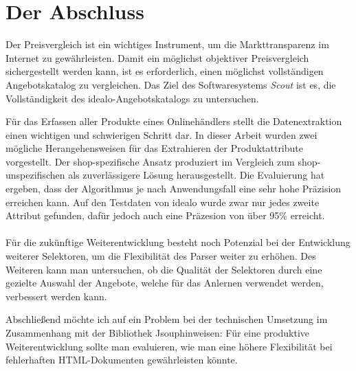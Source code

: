 \section{Der Abschluss}

Der Preisvergleich ist ein wichtiges Instrument, um die Markttransparenz im Internet zu gewährleisten.
Damit ein möglichst objektiver Preisvergleich sichergestellt werden kann, ist es erforderlich, einen möglichst
vollständigen Angebotskatalog zu vergleichen.
Das Ziel des Softwaresystems \textit{Scout} ist es, die Vollständigkeit des idealo-Angebotskatalogs zu untersuchen.

Für das Erfassen aller Produkte eines Onlinehändlers stellt die Datenextraktion einen wichtigen und schwierigen
Schritt dar.
In dieser Arbeit wurden zwei mögliche Herangehensweisen für das Extrahieren der Produktattribute vorgestellt.
Der shop-spezifische Ansatz produziert im Vergleich zum shop-unspezifischen als zuverlässigere Lösung herausgestellt.
Die Evaluierung hat ergeben, dass der Algorithmus je nach Anwendungsfall eine sehr hohe Präzision erreichen kann.
Auf den Testdaten von idealo wurde zwar nur jedes zweite Attribut gefunden, dafür jedoch auch eine Präzesion von über
95\% erreicht.
\\
~\\
Für die zukünftige Weiterentwicklung besteht noch Potenzial bei der Entwicklung weiterer Selektoren, um die
Flexibilität des Parser weiter zu erhöhen.
Des Weiteren kann man untersuchen, ob die Qualität der Selektoren durch eine gezielte Auswahl der Angebote, welche
für das Anlernen verwendet werden, verbessert werden kann.

Abschließend möchte ich auf ein Problem bei der technischen Umsetzung im Zusammenhang mit der Bibliothek
Jsoup\footnotemark hinweisen: Für eine produktive Weiterentwicklung sollte man evaluieren, wie man eine höhere
Flexibilität bei fehlerhaften HTML-Dokumenten gewährleisten könnte.
